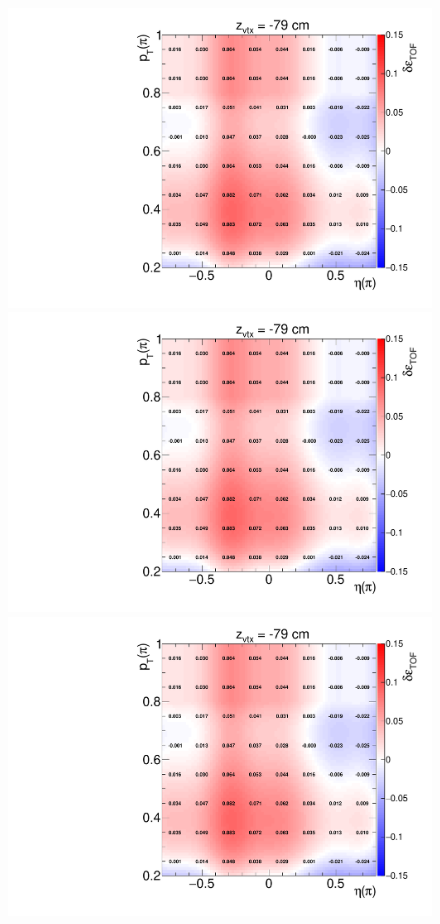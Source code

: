 \begin{figure}
{		\includegraphics[width=\linewidth,page=20]{graphics/systematicsEfficiency/TOF_tagAndProbe/correction/TofEffCorrection3D_pion.pdf}\\
		\includegraphics[width=\linewidth,page=35]{graphics/systematicsEfficiency/TOF_tagAndProbe/correction/TofEffCorrection3D_pion.pdf}\\
		\includegraphics[width=\linewidth,page=46]{graphics/systematicsEfficiency/TOF_tagAndProbe/correction/TofEffCorrection3D_pion.pdf}
}
\end{figure}
